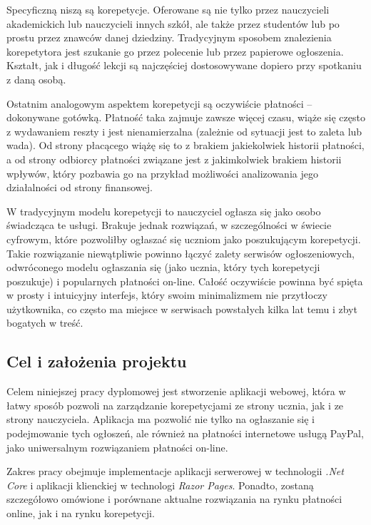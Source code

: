 \documentclass[12pt]{article}
\numberwithin{figure}{section}
\begin{document}
\begin{sloppypar}
Specyficzną niszą są korepetycje. Oferowane są nie tylko przez nauczycieli akademickich lub nauczycieli innych szkół, ale także przez studentów lub po prostu przez znawców danej dziedziny. Tradycyjnym sposobem znalezienia korepetytora jest szukanie go przez polecenie lub przez papierowe ogłoszenia. Kształt, jak i długość lekcji są najczęściej dostosowywane dopiero przy spotkaniu z daną osobą.

Ostatnim analogowym aspektem korepetycji są oczywiście płatności -- dokonywane gotówką. Płatność taka zajmuje zawsze więcej czasu, wiąże się często z wydawaniem reszty i jest nienamierzalna (zależnie od sytuacji jest to zaleta lub wada). Od strony płacącego wiążę się to z brakiem jakiekolwiek historii płatności, a od strony odbiorcy płatności związane jest z jakimkolwiek brakiem historii wpływów, który pozbawia go na przykład możliwości analizowania jego działalności od strony finansowej. 

W tradycyjnym modelu korepetycji to nauczyciel ogłasza się jako osobo świadcząca te usługi. Brakuje jednak rozwiązań, w szczególności w świecie cyfrowym, które pozwoliłby ogłaszać się uczniom jako poszukującym korepetycji. Takie rozwiązanie niewątpliwie powinno łączyć zalety serwisów ogłoszeniowych, odwróconego modelu ogłaszania się (jako ucznia, który tych korepetycji poszukuje) i popularnych płatności on-line. Całość oczywiście powinna być spięta w prosty i intuicyjny interfejs, który swoim minimalizmem nie przytłoczy użytkownika, co często ma miejsce w serwisach powstałych kilka lat temu i zbyt bogatych w treść.
\subsection{Cel i założenia projektu}
Celem niniejszej pracy dyplomowej jest stworzenie aplikacji webowej, która w łatwy sposób pozwoli na zarządzanie korepetycjami ze strony ucznia, jak i ze strony nauczyciela. Aplikacja ma pozwolić nie tylko na ogłaszanie się i podejmowanie tych ogłoszeń, ale również na płatności internetowe usługą PayPal, jako uniwersalnym rozwiązaniem płatności on-line. 

Zakres pracy obejmuje implementacje aplikacji serwerowej w technologii \textit{.Net Core} i aplikacji klienckiej w technologi \textit{Razor Pages}. Ponadto, zostaną szczegółowo omówione i porównane aktualne rozwiązania na rynku płatności online, jak i na rynku korepetycji.


\end{sloppypar}
\end{document}
